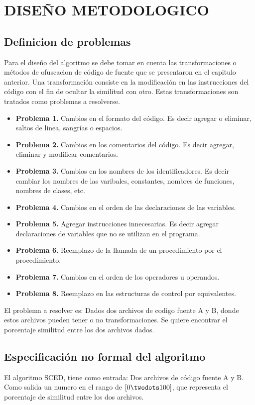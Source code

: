 \chapter{DISEÑO METODOLOGICO}

\section{Definicion de problemas}
Para el diseño del algoritmo se debe tomar en cuenta las transformaciones o métodos de ofuscacion de código de fuente que se presentaron en el capitulo anterior. Una transformación consiste en la modificación en las instrucciones del código con el fin de ocultar la similitud con otro. Estas transformaciones son tratados como problemas a resolverse.

\begin{itemize}
  \item[] \textbf{Problema 1.} Cambios en el formato del código. Es decir agregar o eliminar, saltos de linea, sangrías o espacios.
  \item[] \textbf{Problema 2.} Cambios en los comentarios del código. Es decir agregar, eliminar y modificar comentarios.
  \item[] \textbf{Problema 3.} Cambios en los nombres de los identificadores. Es decir cambiar los nombres de las varibales, constantes, nombres de funciones, nombres de clases, etc.
  \item[] \textbf{Problema 4.} Cambios en el orden de las declaraciones de las variables.
  \item[] \textbf{Problema 5.} Agregar instrucciones innecesarias. Es decir agregar declaraciones de variables que no se utilizan en el programa.
  \item[] \textbf{Problema 6.} Reemplazo de la llamada de un procedimiento por el procedimiento.
  \item[] \textbf{Problema 7.} Cambios en el orden de los operadores u operandos.
  \item[] \textbf{Problema 8.} Reemplazo en las estructuras de control por equivalentes.
\end{itemize}

El problema a resolver es: Dados dos archivos de codigo fuente A y B, donde estos archivos pueden tener o no transformaciones. Se quiere encontrar el porcentaje similitud entre los dos archivos dados.

\section{Especificación no formal del algoritmo}
El algoritmo SCED, tiene como entrada: Dos archivos de código fuente A y B. Como salida un numero en el rango de $[0 \twodots 100]$, que representa el porcentaje de similitud entre los dos archivos.

